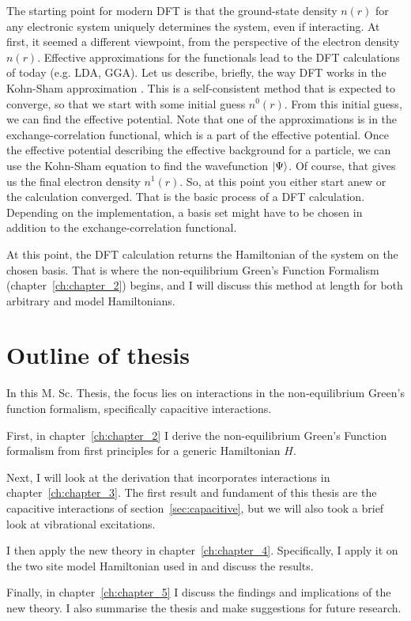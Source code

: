 The starting point for modern DFT is that the ground-state density $n(r)$ for any electronic system uniquely determines the system, even if interacting. At first, it seemed a different viewpoint, from the perspective of the electron density $n(r)$. Effective approximations for the functionals lead to the DFT calculations of today (e.g. LDA, GGA). 
Let us describe, briefly, the way DFT works in the Kohn-Sham approximation \cite{kohnsham}. This is a self-consistent method that is expected to converge, so that we start with some initial guess $n^0(r)$. From this initial guess, we can find the effective potential. Note that one of the approximations is in the exchange-correlation functional, which is a part of the effective potential. Once the effective potential describing the effective background for a particle, we can use the Kohn-Sham equation to find the wavefunction $\ket{\Psi}$. Of course, that gives us the final electron density $n^1(r)$. So, at this point you either start anew or the calculation converged. That is the basic process of a DFT calculation. Depending on the implementation, a basis set might have to be chosen in addition to the exchange-correlation functional.

At this point, the DFT calculation returns the Hamiltonian of the system on the chosen basis. That is where the non-equilibrium Green's Function Formalism (chapter~\ref{ch:chapter_2}) begins, and I will discuss this method at length for both arbitrary and model Hamiltonians.

\section{Outline of thesis}
In this M. Sc. Thesis, the focus lies on interactions in the non-equilibrium Green's function formalism, specifically capacitive interactions.

First, in chapter~\ref{ch:chapter_2} I derive the non-equilibrium Green's Function formalism from first principles for a generic Hamiltonian $H$. 

Next, I will look at the derivation that incorporates interactions in chapter~\ref{ch:chapter_3}. The first result and fundament of this thesis are the capacitive interactions of section~\ref{sec:capacitive}, but we will also took a brief look at vibrational excitations.

I then apply the new theory  in chapter~\ref{ch:chapter_4}. Specifically, I apply it on the two site model Hamiltonian used in \citet{perrinnano} and discuss the results. 

Finally, in chapter~\ref{ch:chapter_5} I discuss the findings and implications of the new theory. I also summarise the thesis and make suggestions for future research.

